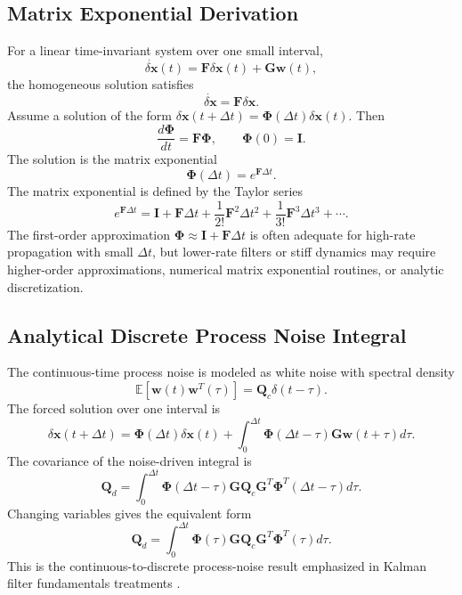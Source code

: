 \documentclass[11pt,oneside]{book}
\newcommand{\E}{\mathbb{E}}
\newcommand{\xb}{\mathbf{x}}
\newcommand{\Ph}{\boldsymbol{\Phi}}
\newcommand{\Qd}{\mathbf{Q}_d}
\newcommand{\Qc}{\mathbf{Q}_c}
\newcommand{\I}{\mathbf{I}}
\begin{document}
\subsection{Matrix Exponential Derivation}
For a linear time-invariant system over one small interval,
\begin{equation}
\dot{\delta\xb}(t)=\mathbf{F}\delta\xb(t)+\mathbf{G}\mathbf{w}(t),
\end{equation}
the homogeneous solution satisfies
\begin{equation}
\dot{\delta\xb}=\mathbf{F}\delta\xb.
\end{equation}
Assume a solution of the form $\delta\xb(t+\Delta t)=\Ph(\Delta t)\delta\xb(t)$. Then
\begin{equation}
\frac{d\Ph}{dt}=\mathbf{F}\Ph,
\qquad \Ph(0)=\I.
\end{equation}
The solution is the matrix exponential
\begin{equation}
\Ph(\Delta t)=e^{\mathbf{F}\Delta t}.
\end{equation}
The matrix exponential is defined by the Taylor series
\begin{equation}
 e^{\mathbf{F}\Delta t}=\I+\mathbf{F}\Delta t+\frac{1}{2!}\mathbf{F}^2\Delta t^2+\frac{1}{3!}\mathbf{F}^3\Delta t^3+\cdots.
\label{eq:matrix_exp_taylor_rev2}
\end{equation}
The first-order approximation $\Ph\approx\I+\mathbf{F}\Delta t$ is often adequate for high-rate propagation with small $\Delta t$, but lower-rate filters or stiff dynamics may require higher-order approximations, numerical matrix exponential routines, or analytic discretization.

\subsection{Analytical Discrete Process Noise Integral}
The continuous-time process noise is modeled as white noise with spectral density
\begin{equation}
\E[\mathbf{w}(t)\mathbf{w}^T(\tau)]=\Qc\delta(t-\tau).
\end{equation}
The forced solution over one interval is
\begin{equation}
\delta\xb(t+\Delta t)=\Ph(\Delta t)\delta\xb(t)+\int_0^{\Delta t}\Ph(\Delta t-\tau)\mathbf{G}\mathbf{w}(t+\tau)d\tau.
\end{equation}
The covariance of the noise-driven integral is
\begin{equation}
\Qd=\int_0^{\Delta t}\Ph(\Delta t-\tau)\mathbf{G}\Qc\mathbf{G}^T\Ph^T(\Delta t-\tau)d\tau.
\label{eq:q_discrete_integral_rev2}
\end{equation}
Changing variables gives the equivalent form
\begin{equation}
\Qd=\int_0^{\Delta t}\Ph(\tau)\mathbf{G}\Qc\mathbf{G}^T\Ph^T(\tau)d\tau.
\end{equation}
This is the continuous-to-discrete process-noise result emphasized in Kalman filter fundamentals treatments \cite{simon2006,brown2012,palumbo2010,vanloan1978}.
\end{document}
